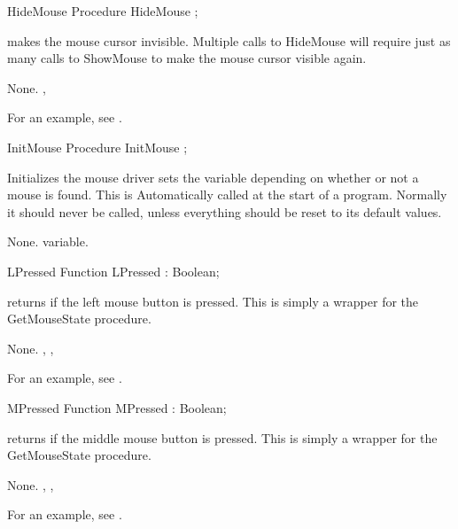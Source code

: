 
\begin{procedure}{HideMouse}
\Declaration
Procedure HideMouse ;

\Description

 makes the mouse cursor invisible.
Multiple calls to HideMouse will require just as many calls to ShowMouse to
make the mouse cursor visible again.

\Errors
None.
\SeeAlso
{}, 
\end{procedure}
For an example, see .
\begin{procedure}{InitMouse}
\Declaration
Procedure InitMouse ;

\Description

Initializes the mouse driver sets the variable  depending on
whether or not a mouse is found. This is Automatically called at the start of 
a program. Normally it should never be called, unless everything should be
reset to its default values.

\Errors
None.
\SeeAlso
{} variable.
\end{procedure}


\begin{function}{LPressed}
\Declaration
Function LPressed  : Boolean;

\Description

 returns  if the left mouse button is pressed.
This is simply a wrapper for the GetMouseState procedure.

\Errors
None.
\SeeAlso
{}, , 
\end{function}

For an example, see .

\begin{function}{MPressed}
\Declaration
Function MPressed  : Boolean;

\Description

 returns  if the middle mouse button is pressed.
This is simply a wrapper for the GetMouseState procedure.

\Errors
None.
\SeeAlso
{}, , 
\end{function}

For an example, see .

